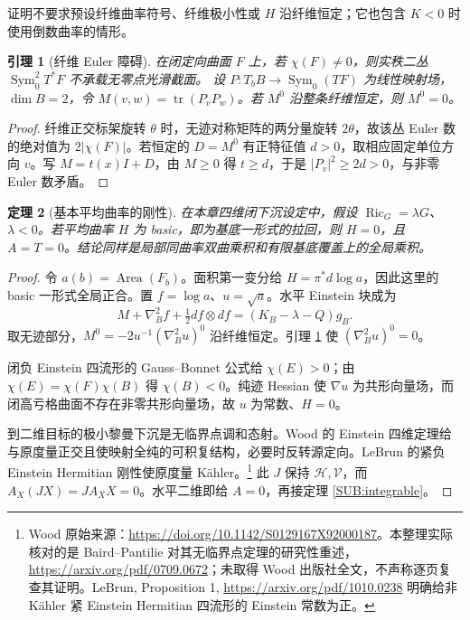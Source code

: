 \documentclass[UTF8,fontset=fandol,zihao=-4,oneside,openany]{ctexbook}
\theoremstyle{cjkplain}
\newtheorem{theorem}{定理}[chapter]
\newtheorem{lemma}[theorem]{引理}
\numberwithin{equation}{chapter}
\begin{document}
证明不要求预设纤维曲率符号、纤维极小性或 $H$ 沿纤维恒定；它也包含 $K<0$ 时使用倒数曲率的情形。

\begin{lemma}[纤维 Euler 障碍]\label{SUB:euler}
在闭定向曲面 $F$ 上，若 $\chi(F)\ne0$，则实秩二丛
$\operatorname{Sym}_0^2T^*F$ 不承载无零点光滑截面。
设 $P:T_bB\to\operatorname{Sym}_0(TF)$ 为线性映射场，$\dim B=2$，令 $M(v,w)=\operatorname{tr}(P_vP_w)$。若 $M^0$ 沿整条纤维恒定，则 $M^0=0$。
\end{lemma}
\begin{proof}
纤维正交标架旋转 $\theta$ 时，无迹对称矩阵的两分量旋转 $2\theta$，故该丛 Euler 数的绝对值为 $2|\chi(F)|$。若恒定的 $D=M^0$ 有正特征值 $d>0$，取相应固定单位方向 $v$。写 $M=t(x)I+D$，由 $M\ge0$ 得 $t\ge d$，于是 $|P_v|^2\ge2d>0$，与非零 Euler 数矛盾。
\end{proof}

\begin{theorem}[基本平均曲率的刚性]\label{SUB:basic}
在本章四维闭下沉设定中，假设 $\operatorname{Ric}_G=\lambda G$、$\lambda<0$。若平均曲率 $H$ 为 basic，即为基底一形式的拉回，则 $H=0$，且 $A=T=0$。结论同样是局部同曲率双曲乘积和有限基底覆盖上的全局乘积。
\end{theorem}
\begin{proof}
令 $a(b)=\operatorname{Area}(F_b)$。面积第一变分给 $H=\pi^*d\log a$，因此这里的 basic 一形式全局正合。置 $f=\log a$、$u=\sqrt a$。水平 Einstein 块成为
\[
M+\nabla_B^2f+\tfrac12df\otimes df=(K_B-\lambda-Q)g_B.
\]
取无迹部分，$M^0=-2u^{-1}(\nabla_B^2u)^0$ 沿纤维恒定。引理 \ref{SUB:euler} 使 $(\nabla_B^2u)^0=0$。

闭负 Einstein 四流形的 Gauss--Bonnet 公式给 $\chi(E)>0$；由
$\chi(E)=\chi(F)\chi(B)$ 得 $\chi(B)<0$。纯迹 Hessian 使 $\nabla u$ 为共形向量场，而闭高亏格曲面不存在非零共形向量场，故 $u$ 为常数、$H=0$。

到二维目标的极小黎曼下沉是无临界点调和态射。Wood 的 Einstein 四维定理给与原度量正交且使映射全纯的可积复结构，必要时反转源定向。LeBrun 的紧负 Einstein Hermitian 刚性使原度量 Kähler。\footnote{Wood 原始来源：\url{https://doi.org/10.1142/S0129167X92000187}。本整理实际核对的是 Baird--Pantilie 对其无临界点定理的研究性重述，\url{https://arxiv.org/pdf/0709.0672}；未取得 Wood 出版社全文，不声称逐页复查其证明。LeBrun, Proposition 1, \url{https://arxiv.org/pdf/1010.0238} 明确给非 Kähler 紧 Einstein Hermitian 四流形的 Einstein 常数为正。}
此 $J$ 保持 $\mathcal H,\mathcal V$，而
$A_X(JX)=J A_XX=0$。水平二维即给 $A=0$，再接定理 \ref{SUB:integrable}。
\end{proof}
\end{document}
